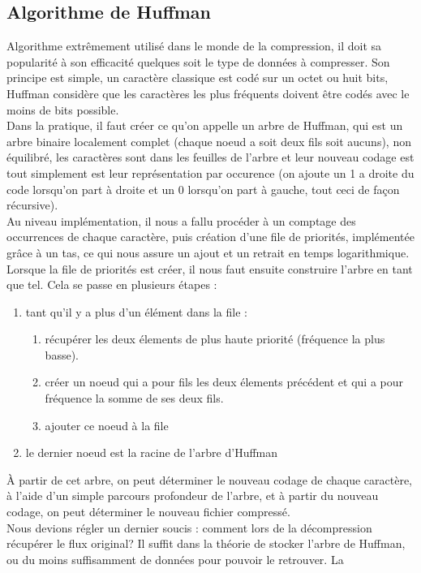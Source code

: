 \documentclass[a4paper,12pt]{article}
\begin{document}
	\subsection{Algorithme de Huffman}
Algorithme extrêmement utilisé dans le monde de la compression, il doit sa
popularité à son efficacité quelques soit le type de données à compresser. Son
principe est simple, un caractère classique est codé sur un octet ou huit bits,
Huffman considère que les caractères les plus fréquents doivent être codés avec
le moins de bits possible.\\
Dans la pratique, il faut créer ce qu'on appelle un arbre de Huffman, qui est un
arbre binaire localement complet (chaque noeud a soit deux fils soit aucuns),
non équilibré, les caractères sont dans les feuilles de l'arbre et leur nouveau
codage est tout simplement est leur représentation par occurence (on ajoute un 1
a droite du code lorsqu'on part à droite et un 0 lorsqu'on part à gauche, tout
ceci de façon récursive).\\
Au niveau implémentation, il nous a fallu procéder à un comptage des occurrences
de chaque caractère, puis création d'une file de priorités, implémentée grâce à
un tas, ce qui nous assure un ajout et un retrait en temps logarithmique.
Lorsque la file de priorités est créer, il nous faut ensuite construire l'arbre
en tant que tel. Cela se passe en plusieurs étapes :
\begin{enumerate}
\item tant qu'il y a plus d'un élément dans la file :
\begin{enumerate}
\item récupérer les deux élements de plus haute priorité (fréquence la
plus basse).
\item créer un noeud qui a pour fils les deux élements précédent et qui
a pour fréquence la somme de ses deux fils.
\item ajouter ce noeud à la file
\end{enumerate}
\item le dernier noeud est la racine de l'arbre d'Huffman
\end{enumerate}
À partir de cet arbre, on peut déterminer le nouveau codage de chaque caractère,
à l'aide d'un simple parcours profondeur de l'arbre, et à partir du nouveau
codage, on peut déterminer le nouveau fichier compressé.\\
Nous devions régler un dernier soucis : comment lors de la décompression
récupérer le flux original? Il suffit dans la théorie de stocker l'arbre de
Huffman, ou du moins suffisamment de données pour pouvoir le retrouver. La
\end{document}
